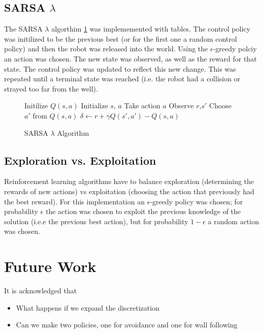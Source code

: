 \documentclass[conference]{IEEEtran}
\begin{document}
\subsection{SARSA $\lambda$}
The SARSA $\lambda$ algorthim \ref{SARSALambda} was implememented with tables. 
The control policy was initilized to be the previous best (or for the first one a random control policy) and then the robot was released into the world.
Using the $\epsilon$-greedy polciy an action was chosen.  The new state was observed, as well as the reward for that state. The control policy was updated to reflect this new change.  This was repeated until a terminal state was reached (i.e. the robot had a collision or strayed too far from the well).
\begin{figure}
\begin{algorithmic}[1]
\State Initilize $Q(s,a)$
    \State Initialize $s$, $a$
        \State Take action $a$
        \State Observe $r$,$s'$
        \State Choose $a'$ from $Q(s,a)$
        \State $\delta \gets r + \gamma Q(s',a') - Q(s,a)$
    \EndWhile
\EndWhile
\EndProcedure
\end{algorithmic}
\caption{SARSA $\lambda$ Algorithm}
\label{SARSALambda}
\end{figure}
\subsection{Exploration vs. Exploitation}
Reinforcement learning algorithms have to balance exploration (determining the rewards of new actions) vs exploitation (choosing the action that previously had the best reward). For this implementation an $\epsilon$-greedy policy was chosen; for probability $\epsilon$ the action was chosen to exploit the previous knowledge of the solution (i.e.e the previous best action), but for probability $1-\epsilon$ a random action was chosen.
\section{Future Work}
It is acknowledged that
\begin{itemize}
	\item What happens if we expand the discretization
	\item Can we make two policies, one for avoidance and one for wall following
\end{itemize}
\end{document}
